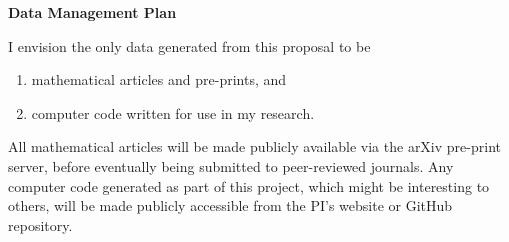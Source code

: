 \documentclass[12pt]{amsart}
\begin{document}
\begin{center}
\textbf{Data Management Plan}
\end{center}

\vspace{1cm}
I envision the only data generated from this proposal to be 
\begin{enumerate}
	\item mathematical articles and pre-prints, and
	\item computer code written for use in my research.
\end{enumerate}
All mathematical articles will be made publicly available via the arXiv pre-print server, before eventually being submitted to peer-reviewed journals.  Any computer code generated as part of this project, which might be interesting to others, will be made publicly accessible from the PI's website or GitHub repository. 

 \pagestyle{empty}
\end{document}
